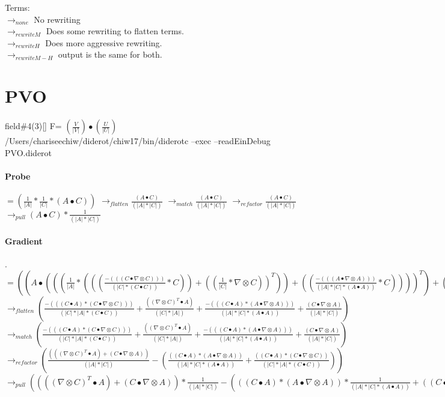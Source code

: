\documentclass{article}
\begin{document}
Terms:\\
 $\rightarrow_{none}$ No rewriting\\
$\rightarrow_{rewriteM}$ Does some rewriting to flatten terms.\\
$\rightarrow_{rewriteH}$ Does more aggressive rewriting.\\
$\rightarrow_{rewriteM-H}$ output is the same for both.
 
\section{PVO}
field\#4(3)[] F= $(\frac{V}{|V|})\bullet(\frac{U}{|U|})$\\
/Users/chariseechiw/diderot/chiw17/bin/diderotc --exec --readEinDebug PVO.diderot
\paragraph{Probe} 
$= ( \frac{1}{|A|}* \frac{1}{|C|}*(A \bullet C))$
\newline $\rightarrow_{flatten} \frac{(A \bullet C)}{(|A|*|C|)}$
\newline $\rightarrow_{match} \frac{(A \bullet C)}{(|A|*|C|)}$
\newline $\rightarrow_{refactor} \frac{(A \bullet C)}{(|A|*|C|)}$
\newline $\rightarrow_{pull}(A \bullet C)* \frac{1}{(|A|*|C|)}$
\paragraph{Gradient}. 
$= ((A \bullet ((( \frac{1}{|A|}*((( \frac{-(((C \bullet  \nabla  \otimes C)))}{(|C|*(C \bullet C))}*C))+(( \frac{1}{|C|}* \nabla  \otimes C))^T))+(( \frac{-(((A \bullet  \nabla  \otimes A)))}{(|A|*|C|*(A \bullet A))}*C))))^T)+( \frac{1}{|A|}* \frac{1}{|C|}*(C \bullet  \nabla  \otimes A)))$
\newline $\rightarrow_{flatten}( \frac{-(((C \bullet A)*(C \bullet  \nabla  \otimes C)))}{(|C|*|A|*(C \bullet C))}+ \frac{(( \nabla  \otimes C)^T \bullet A)}{(|C|*|A|)}+ \frac{-(((C \bullet A)*(A \bullet  \nabla  \otimes A)))}{(|A|*|C|*(A \bullet A))}+ \frac{(C \bullet  \nabla  \otimes A)}{(|A|*|C|)})$
\newline $\rightarrow_{match}( \frac{-(((C \bullet A)*(C \bullet  \nabla  \otimes C)))}{(|C|*|A|*(C \bullet C))}+ \frac{(( \nabla  \otimes C)^T \bullet A)}{(|C|*|A|)}+ \frac{-(((C \bullet A)*(A \bullet  \nabla  \otimes A)))}{(|A|*|C|*(A \bullet A))}+ \frac{(C \bullet  \nabla  \otimes A)}{(|A|*|C|)})$
\newline $\rightarrow_{refactor}( \frac{((( \nabla  \otimes C)^T \bullet A)+(C \bullet  \nabla  \otimes A))}{(|A|*|C|)}-( \frac{((C \bullet A)*(A \bullet  \nabla  \otimes A))}{(|A|*|C|*(A \bullet A))}+ \frac{((C \bullet A)*(C \bullet  \nabla  \otimes C))}{(|C|*|A|*(C \bullet C))}))$
\newline $\rightarrow_{pull}(((( \nabla  \otimes C)^T \bullet A)+(C \bullet  \nabla  \otimes A))* \frac{1}{(|A|*|C|)}-(((C \bullet A)*(A \bullet  \nabla  \otimes A))* \frac{1}{(|A|*|C|*(A \bullet A))}+((C \bullet A)*(C \bullet  \nabla  \otimes C))* \frac{1}{(|C|*|A|*(C \bullet C))}))$
\end{document}
